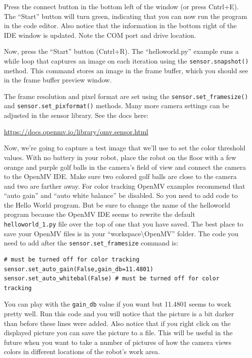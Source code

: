 \documentclass[11pt]{article}
\begin{document}
Press the connect button in the bottom left of the window (or press Cntrl+E). The “Start” button will turn green, indicating that you can now run the program in the code editor. Also notice that the information in the bottom right of the IDE window is updated. Note the COM port and drive location.

Now, press the “Start” button (Cntrl+R). The “helloworld.py” example runs a while loop that captures an image on each iteration using the \texttt{sensor.snapshot()} method. This command stores an image in the frame buffer, which you should see in the frame buffer preview window.

The frame resolution and pixel format are set using the \texttt{sensor.set_framesize()} and \texttt{sensor.set_pixformat()} methods. Many more camera settings can be adjusted in the sensor library. See the docs here:
%
\begin{center}
    \url{https://docs.openmv.io/library/omv.sensor.html}
\end{center}
%
Now, we’re going to capture a test image that we’ll use to set the color threshold values. With no battery in your robot, place the robot on the floor with a few orange and purple golf balls in the camera’s field of view and connect the camera to the OpenMV IDE. Make sure two colored golf balls are close to the camera and two are farther away. For color tracking OpenMV examples recommend that “auto gain” and “auto white balance” be disabled. So you need to add code to the Hello World program. But be sure to change the name of the helloworld program because the OpenMV IDE seems to rewrite the default \texttt{helloworld\_1.py} file over the top of one that you have saved. The best place to save your OpenMV files is in your “workspace\textbackslash{}OpenMV” folder. The code you need to add after the \texttt{sensor.set_framesize} command is:
%
\begin{verbatim}
# must be turned off for color tracking
sensor.set_auto_gain(False,gain_db=11.4801)
sensor.set_auto_whitebal(False) # must be turned off for color tracking
\end{verbatim}
%
You can play with the \texttt{gain_db} value if you want but 11.4801 seems to work pretty well. Run this code and you will notice that the picture is a bit darker than before these lines were added. Also notice that if you right click on the displayed picture you can save the picture to a file. This will be useful in the future when you want to take a number of pictures of how the camera views colors in different locations of the robot’s work area.
\end{document}
